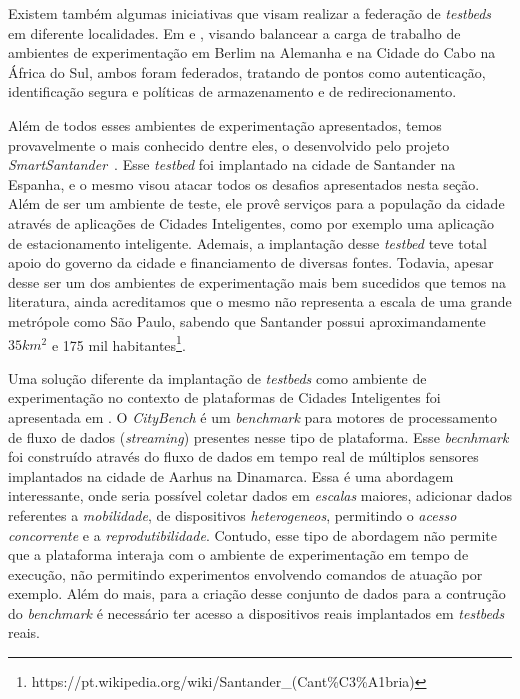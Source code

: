 Existem também algumas iniciativas que visam realizar a federação de \textit{testbeds} em diferente localidades.
Em \cite{mwangama_2013} e \cite{corici_2014}, visando balancear a carga de trabalho de ambientes de experimentação em Berlim na Alemanha e na Cidade do Cabo na África do Sul, ambos foram federados,
tratando de pontos como autenticação, identificação segura e políticas de armazenamento e de redirecionamento.

Além de todos esses ambientes de experimentação apresentados, temos provavelmente o mais conhecido dentre eles, o desenvolvido pelo projeto \textit{SmartSantander}~\cite{sanchez_2014}.
Esse \textit{testbed} foi implantado na cidade de Santander na Espanha, e o mesmo visou atacar todos os desafios apresentados nesta seção.
Além de ser um ambiente de teste, ele provê serviços para a população da cidade através de aplicações de Cidades Inteligentes, como por exemplo uma aplicação de estacionamento inteligente.
Ademais, a implantação desse \textit{testbed} teve total apoio do governo da cidade e financiamento de diversas fontes.
Todavia, apesar desse ser um dos ambientes de experimentação mais bem sucedidos que temos na literatura, ainda acreditamos que o mesmo não representa a escala de uma grande metrópole como
São Paulo, sabendo que Santander possui aproximandamente $ 35 km^2 $ e 175 mil habitantes\footnote{https://pt.wikipedia.org/wiki/Santander\_(Cant\%C3\%A1bria)}.

Uma solução diferente da implantação de \textit{testbeds} como ambiente de experimentação no contexto de plataformas de Cidades Inteligentes foi apresentada em \cite{ali_2015}.
O \textit{CityBench} é um \textit{benchmark} para motores de processamento de fluxo de dados (\textit{streaming}) presentes nesse tipo de plataforma.
Esse \textit{becnhmark} foi construído através do fluxo de dados em tempo real de múltiplos sensores implantados na cidade de Aarhus na Dinamarca.
Essa é uma abordagem interessante, onde seria possível coletar dados em \textit{escalas} maiores, adicionar dados referentes a \textit{mobilidade}, de dispositivos \textit{heterogeneos}, permitindo
o \textit{acesso concorrente} e a \textit{reprodutibilidade}.
Contudo, esse tipo de abordagem não permite que a plataforma interaja com o ambiente de experimentação em tempo de execução, não permitindo experimentos envolvendo comandos de atuação por exemplo.
Além do mais, para a criação desse conjunto de dados para a contrução do \textit{benchmark} é necessário ter acesso a dispositivos reais implantados em \textit{testbeds} reais.

